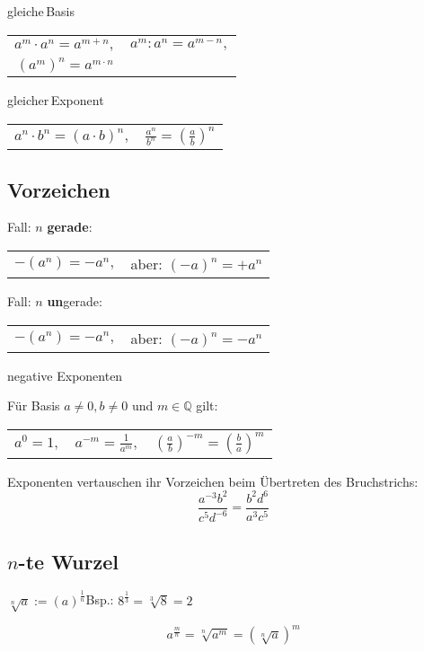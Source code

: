 \begin{multicols}{2}
\begin{gesetz*}{gleiche\,Basis}{}
\begin{tabular}{cc}
$a^m\cdot{}a^n = a^{m+n},$ & $a^m:a^n=a^{m-n},$ \\
$\left(a^m\right)^n = a^{m\cdot{}n}$ &\\
 \end{tabular} 
\end{gesetz*}

\begin{gesetz*}{gleicher\,Exponent}{}
\begin{tabular}{cc}
$a^n\cdot{}b^n = (a\cdot{}b)^n,$ & $\frac{a^n}{b^n} =\left(\frac{a}b\right)^n $\\
 \end{tabular}
\end{gesetz*}

\subsection*{Vorzeichen}
Fall: $n$ \textbf{gerade}:

\begin{tabular}{cc}
 $-(a^n) = -a^n,$ & aber: $(-a)^n = +a^n$\\
 \end{tabular} 

Fall: $n$ \textbf{un}gerade:

\begin{tabular}{cc}
 $-(a^n) = -a^n,$ & aber: $(-a)^n = -a^n$\\
 \end{tabular} 


\begin{gesetz*}{negative Exponenten}{}

Für Basis $a\ne 0, b\ne 0$ und $m \in\mathbb{Q}$ gilt:

\begin{tabular}{ccc}
$a^0=1,$ & $a^{-m} = \frac1{a^m},$ & $\left(\frac{a}b\right)^{-m} = \left(\frac{b}a\right)^m$ \\
 \end{tabular}
\end{gesetz*}

\begin{rezept*}{}{}{}
Exponenten vertauschen ihr Vorzeichen beim Übertreten des Bruchstrichs:
$$\frac{a^{-3}b^2}{c^5d^{-6}} = \frac{b^2d^6}{a^3c^5}$$
\end{rezept*}

\subsection*{$n$-te Wurzel}
$\sqrt[n]{a} := \left(a\right)^\frac1n$\hfill{}Bsp.: $8^{\frac13}=\sqrt[3]{8}=2$
\begin{gesetz*}{}{}
$$a^{\frac{m}n} = \sqrt[n]{a^m} = \left(\sqrt[n]a\right)^m$$
\end{gesetz*}%


\end{multicols}
